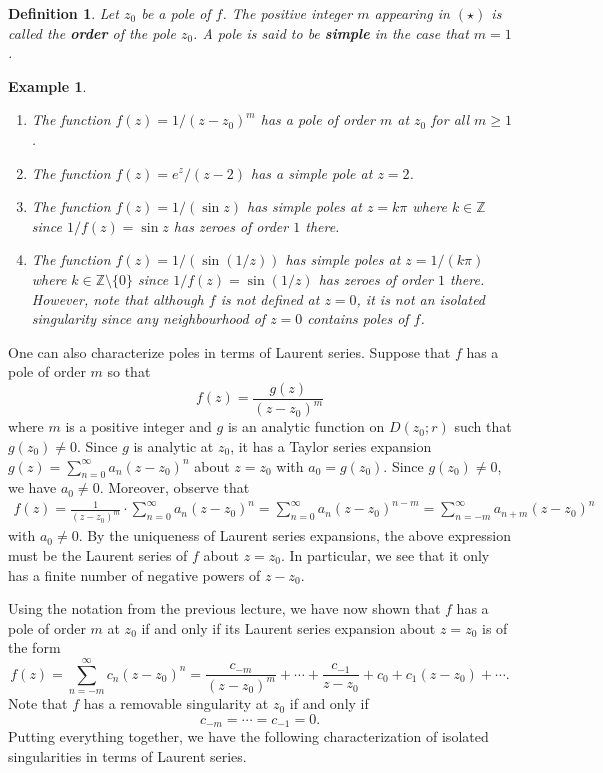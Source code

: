 \documentclass[10pt]{article}
\newcommand{\Z}{\mathbb{Z}}
\theoremstyle{newstyle}
\newtheorem{defn}[thm]{Definition}
\newtheorem{exmp}[thm]{Example}
\begin{document}
\begin{defn}
Let $z_0$ be a pole of $f$. The positive integer $m$ appearing in $(\star)$ is called the 
{\bf order} of the pole $z_0$. A pole is said to be {\bf simple} in the case that $m = 1$. 
\end{defn}

\begin{exmp}~
\begin{enumerate}[(1)]
    \item The function $f(z) = 1/(z-z_0)^m$ has a pole of order $m$ at $z_0$ for all $m \geq 1$. 
    \item The function $f(z) = e^z/(z-2)$ has a simple pole at $z = 2$. 
    \item The function $f(z) = 1/(\sin z)$ has simple poles at $z = k\pi$ where $k \in \Z$ since 
    $1/f(z) = \sin z$ has zeroes of order $1$ there. 
    \item The function $f(z) = 1/(\sin(1/z))$ has simple poles at $z = 1/(k\pi)$ where $k \in 
    \Z \setminus \{0\}$ since $1/f(z) = \sin(1/z)$ has zeroes of order $1$ there. However, 
    note that although $f$ is not defined at $z = 0$, it is not an isolated singularity 
    since any neighbourhood of $z = 0$ contains poles of $f$. 
\end{enumerate}
\end{exmp}

One can also characterize poles in terms of Laurent series. Suppose that $f$ has a pole of 
order $m$ so that 
\[ f(z) = \frac{g(z)}{(z-z_0)^m} \]
where $m$ is a positive integer and $g$ is an analytic function on $D(z_0; r)$ such that $g(z_0) \neq 0$. 
Since $g$ is analytic at $z_0$, it has a Taylor series expansion $g(z) = \sum_{n=0}^\infty a_n(z-z_0)^n$ 
about $z = z_0$ with $a_0 = g(z_0)$. Since $g(z_0) \neq 0$, we have $a_0 \neq 0$. Moreover, observe that 
\begin{align*}
    f(z) = \frac{1}{(z-z_0)^m} \cdot \sum_{n=0}^\infty a_n(z-z_0)^n 
    = \sum_{n=0}^\infty a_n(z-z_0)^{n-m} = \sum_{n=-m}^\infty a_{n+m} (z-z_0)^n 
\end{align*}
with $a_0 \neq 0$. By the uniqueness of Laurent series expansions, the above expression must be the 
Laurent series of $f$ about $z = z_0$. In particular, we see that it only has a finite number 
of negative powers of $z - z_0$. 

Using the notation from the previous lecture, we have now shown that $f$ has a pole of 
order $m$ at $z_0$ if and only if its Laurent series expansion about $z = z_0$ is of the form 
\[ f(z) = \sum_{n=-m}^\infty c_n(z-z_0)^n = \frac{c_{-m}}{(z-z_0)^m} + 
\cdots + \frac{c_{-1}}{z-z_0} + c_0 + c_1(z-z_0) + \cdots. \]
Note that $f$ has a removable singularity at $z_0$ if and only if 
\[ c_{-m} = \cdots = c_{-1} = 0. \]
Putting everything together, we have the following characterization of isolated singularities 
in terms of Laurent series. 
\end{document}
